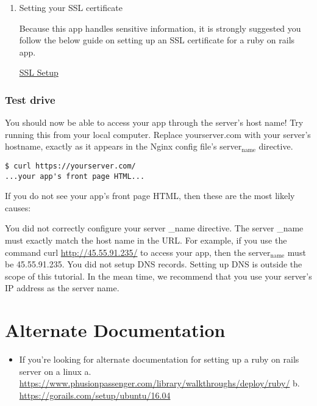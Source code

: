 \documentclass[11pt]{article}
\begin{document}
\begin{enumerate}
\item Setting your SSL certificate
\label{sec:org52caab0}

Because this app handles sensitive information, it is strongly suggested you follow the below guide on setting up an SSL certificate for a ruby on rails app.

\href{https://www.pluralsight.com/guides/ruby-ruby-on-rails/using-https-with-ruby-on-rails}{SSL Setup}
\end{enumerate}

\subsubsection{Test drive}
\label{sec:org1a0bde4}

You should now be able to access your app through the server's host name! Try running this from your local computer. Replace yourserver.com with your server's hostname, exactly as it appears in the Nginx config file's server\(_{\text{name}}\) directive.

\begin{verbatim}
$ curl https://yourserver.com/
...your app's front page HTML...
\end{verbatim}

If you do not see your app's front page HTML, then these are the most likely causes:

You did not correctly configure your server \_name directive. The server \_name must exactly match the host name in the URL. For example, if you use the command curl \url{http://45.55.91.235/} to access your app, then the server\(_{\text{name}}\) must be 45.55.91.235.
You did not setup DNS records. Setting up DNS is outside the scope of this tutorial. In the mean time, we recommend that you use your server's IP address as the server name.
\section{Alternate Documentation}
\label{sec:orga895025}
\begin{itemize}
\item If you're looking for alternate documentation for setting up a ruby on rails server on a linux
a. \url{https://www.phusionpassenger.com/library/walkthroughs/deploy/ruby/}
b. \url{https://gorails.com/setup/ubuntu/16.04}
\end{itemize}
\end{document}
